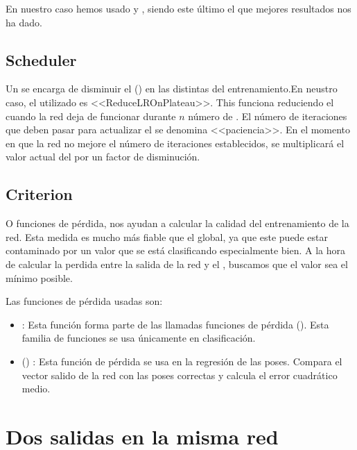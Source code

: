 En nuestro caso hemos usado  y , siendo este último el que mejores resultados nos ha dado.

\subsection{Scheduler}

Un  se encarga de disminuir el  () en las distintas  del entrenamiento.En neustro caso, el  utilizado es <<ReduceLROnPlateau>>. This  funciona reduciendo el  cuando la red deja de funcionar durante $n$ número de . El número de iteraciones que deben pasar para actualizar el  se denomina <<paciencia>>. En el momento en que la red no mejore el número de iteraciones establecidos, se multiplicará el valor actual del  por un factor de disminución.

\subsection{Criterion}

O funciones de pérdida, nos ayudan a calcular la calidad del entrenamiento de la red. Esta medida es mucho más fiable que el  global, ya que este puede estar contaminado por un valor que se está clasificando especialmente bien. A la hora de calcular la perdida entre la salida de la red y el , buscamos que el valor sea el mínimo posible.

Las funciones de pérdida usadas son:

\begin{itemize}
  \item {} : Esta función forma parte de las llamadas funciones de pérdida  (). Esta familia de funciones se usa únicamente en clasificación.
  \item {} () : Esta función de pérdida se usa en la regresión de las poses. Compara el vector salido de la red con las poses correctas y calcula el error cuadrático medio.
\end{itemize}



\section{Dos salidas en la misma red}

